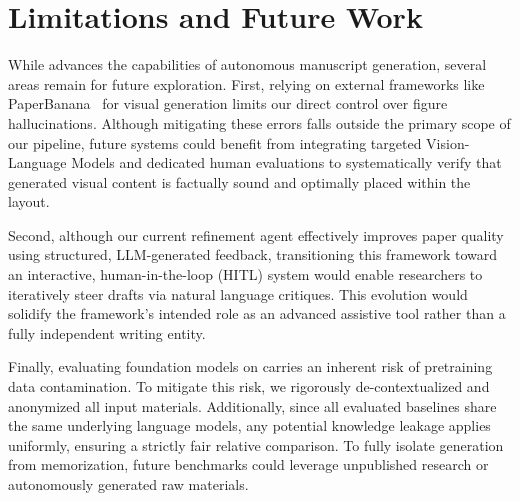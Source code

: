 \section{Limitations and Future Work}
\label{appendix:limitations}

While \ourmethod{} advances the capabilities of autonomous manuscript generation, several areas remain for future exploration. First, relying on external frameworks like PaperBanana~\citep{zhu2026paperbanana} for visual generation limits our direct control over figure hallucinations. Although mitigating these errors falls outside the primary scope of our pipeline, future systems could benefit from integrating targeted Vision-Language Models and dedicated human evaluations to systematically verify that generated visual content is factually sound and optimally placed within the \mylatex{} layout. 

Second, although our current refinement agent effectively improves paper quality using structured, LLM-generated feedback, transitioning this framework toward an interactive, human-in-the-loop (HITL) system would enable researchers to iteratively steer drafts via natural language critiques. This evolution would solidify the framework's intended role as an advanced assistive tool rather than a fully independent writing entity. 

Finally, evaluating foundation models on \ourdataset{} carries an inherent risk of pretraining data contamination. To mitigate this risk, we rigorously de-contextualized and anonymized all input materials. Additionally, since all evaluated baselines share the same underlying language models, any potential knowledge leakage applies uniformly, ensuring a strictly fair relative comparison. To fully isolate generation from memorization, future benchmarks could leverage unpublished research or autonomously generated raw materials.